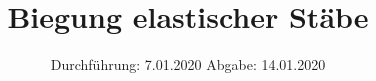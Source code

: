 

\subject{Versuch 103}
\title{Biegung elastischer Stäbe}
\date{%
  Durchführung: 7.01.2020
  \hspace{3em}
  Abgabe: 14.01.2020
}



\maketitle
\thispagestyle{empty}
\tableofcontents
\newpage






\nocite{*}
\printbibliography{}


